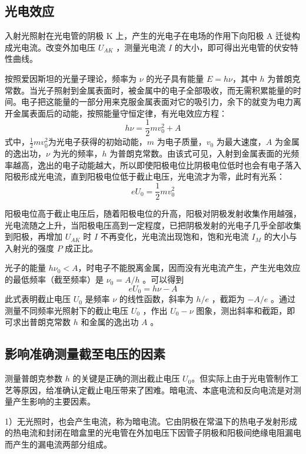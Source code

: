 \documentclass[12pt]{article}
\begin{document}
\subsection{光电效应}
入射光照射在光电管的阴极 K 上，产生的光电子在电场的作用下向阳极 A 迁徙构成光电流。改变外加电压 $U_{AK}$ ，测量光电流 $I$ 的大小，即可得出光电管的伏安特性曲线。

按照爱因斯坦的光量子理论，频率为 $\nu$ 的光子具有能量 $E=h\nu$，其中 $h$ 为普朗克常数。当光子照射到金属表面时，被金属中的电子全部吸收，而无需积累能量的时间。电子把这能量的一部分用来克服金属表面对它的吸引力，余下的就变为电力离开金属表面后的动能，按照能量守恒定律，有光电效应方程：
\begin{equation}
    h\nu=\frac{1}{2}mv_0^2+A
\end{equation}
式中，$\frac12 mv_0^2$为光电子获得的初始动能，$m$ 为电子质量，$v_0$ 为最大速度，$A$ 为金属的逸出功，$\nu$ 为光的频率，$h$ 为普朗克常数。由该式可见，入射到金属表面的光频率越高，逸出的电子动能越大，所以即使阳极电位比阴极电位低时也会有电子落入阳极形成光电流，直到阳极电位低于截止电压，光电流才为零，此时有光系：
\begin{equation}
    eU_0=\frac{1}{2}mv_0^2
\end{equation}

阳极电位高于截止电压后，随着阳极电位的升高，阳极对阴极发射收集作用越强，光电流随之上升，当阳极电压高到一定程度，已把阴极发射的光电子几乎全部收集到阳极，再增加 $U_{AK}$ 时 $I$ 不再变化，光电流出现饱和，饱和光电流 $I_M$ 的大小与入射光的强度 $P$ 成正比。

光子的能量 $h\nu_0 <A$，时电子不能脱离金属，因而没有光电流产生，产生光电效应的最低频率（截至频率）是 $\nu_0=A/h$ 。可以得到
\begin{equation}
    eU_0=h\nu-A
\end{equation}
此式表明截止电压 $U_0$ 是频率 $\nu$ 的线性函数，斜率为 $h/e$ ，截距为 $-A/e$ 。通过测量不同频率光照射下的截止电压 $U_0$ ，作出 $U_0-\nu$ 图象，测出斜率和截距，即可求出普朗克常数 $h$ 和金属的逸出功 $A$ 。


\subsection{影响准确测量截至电压的因素}
测量普朗克参数 $h$ 的关键是正确的测出截止电压 $U_0$。但实际上由于光电管制作工艺等原因，给准确认定截止电压带来了困难。暗电流、本底电流和反向电流是对测量产生影响的主要因素。

1）无光照时，也会产生电流，称为暗电流。它由阴极在常温下的热电子发射形成的热电流和封闭在暗盒里的光电管在外加电压下因管子阴极和阳极间绝缘电阻漏电而产生的漏电流两部分组成。
\end{document}
